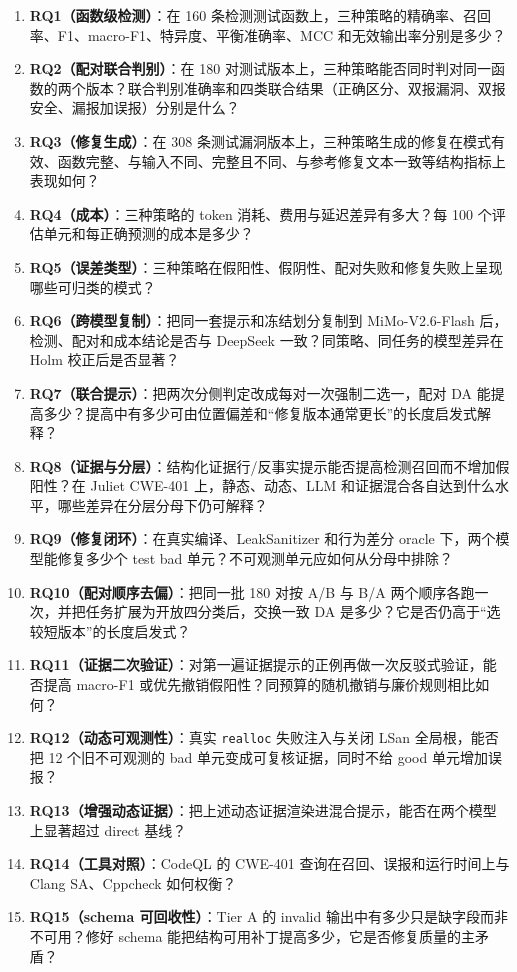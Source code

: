 \documentclass[conference]{IEEEtran}
\begin{document}
\begin{enumerate}
    \item \textbf{RQ1（函数级检测）}：在 160 条检测测试函数上，三种策略的精确率、召回率、F1、macro-F1、特异度、平衡准确率、MCC 和无效输出率分别是多少？
    \item \textbf{RQ2（配对联合判别）}：在 180 对测试版本上，三种策略能否同时判对同一函数的两个版本？联合判别准确率和四类联合结果（正确区分、双报漏洞、双报安全、漏报加误报）分别是什么？
    \item \textbf{RQ3（修复生成）}：在 308 条测试漏洞版本上，三种策略生成的修复在模式有效、函数完整、与输入不同、完整且不同、与参考修复文本一致等结构指标上表现如何？
    \item \textbf{RQ4（成本）}：三种策略的 token 消耗、费用与延迟差异有多大？每 100 个评估单元和每正确预测的成本是多少？
    \item \textbf{RQ5（误差类型）}：三种策略在假阳性、假阴性、配对失败和修复失败上呈现哪些可归类的模式？
    \item \textbf{RQ6（跨模型复制）}：把同一套提示和冻结划分复制到 MiMo-V2.6-Flash 后，检测、配对和成本结论是否与 DeepSeek 一致？同策略、同任务的模型差异在 Holm 校正后是否显著？
    \item \textbf{RQ7（联合提示）}：把两次分侧判定改成每对一次强制二选一，配对 DA 能提高多少？提高中有多少可由位置偏差和“修复版本通常更长”的长度启发式解释？
    \item \textbf{RQ8（证据与分层）}：结构化证据行/反事实提示能否提高检测召回而不增加假阳性？在 Juliet CWE-401 上，静态、动态、LLM 和证据混合各自达到什么水平，哪些差异在分层分母下仍可解释？
    \item \textbf{RQ9（修复闭环）}：在真实编译、LeakSanitizer 和行为差分 oracle 下，两个模型能修复多少个 test bad 单元？不可观测单元应如何从分母中排除？
    \item \textbf{RQ10（配对顺序去偏）}：把同一批 180 对按 A/B 与 B/A 两个顺序各跑一次，并把任务扩展为开放四分类后，交换一致 DA 是多少？它是否仍高于“选较短版本”的长度启发式？
    \item \textbf{RQ11（证据二次验证）}：对第一遍证据提示的正例再做一次反驳式验证，能否提高 macro-F1 或优先撤销假阳性？同预算的随机撤销与廉价规则相比如何？
    \item \textbf{RQ12（动态可观测性）}：真实 \texttt{realloc} 失败注入与关闭 LSan 全局根，能否把 12 个旧不可观测的 bad 单元变成可复核证据，同时不给 good 单元增加误报？
    \item \textbf{RQ13（增强动态证据）}：把上述动态证据渲染进混合提示，能否在两个模型上显著超过 direct 基线？
    \item \textbf{RQ14（工具对照）}：CodeQL 的 CWE-401 查询在召回、误报和运行时间上与 Clang SA、Cppcheck 如何权衡？
    \item \textbf{RQ15（schema 可回收性）}：Tier A 的 invalid 输出中有多少只是缺字段而非不可用？修好 schema 能把结构可用补丁提高多少，它是否修复质量的主矛盾？
\end{enumerate}
\end{document}
